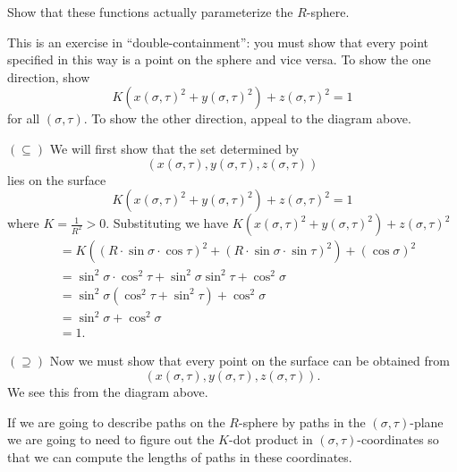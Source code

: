 \documentclass[newpage,hints,handout]{ximera}
\begin{document}
\begin{problem}
  Show that these functions actually parameterize the $R$-sphere.
\begin{hint}
This is an exercise in ``double-containment'': you must show that every point
specified in this way is a point on the sphere and vice versa.  To show the one
direction, show
\[
K\left(x(\sigma,\tau) ^{2}+y(\sigma,\tau) ^{2}\right) +z(\sigma,\tau)^{2} = 1
\]
for all $(\sigma,\tau)$. To show the other direction, appeal to the
diagram above.
\end{hint}
\begin{freeResponse}
  $(\subseteq)$ We will first show that the set determined by
  \[
  \left(x(\sigma,\tau), y(\sigma,\tau), z(\sigma,\tau)\right)
  \]
  lies on the surface
  \[
  K\left(x(\sigma,\tau) ^{2}+y(\sigma,\tau) ^{2}\right) +z(\sigma,\tau)^{2} = 1
  \]
  where $K=\frac{1}{R^2}>0$. Substituting we have
  $K\left(x(\sigma,\tau) ^{2}+y(\sigma,\tau) ^{2}\right)
  +z(\sigma,\tau)^{2}$
  \begin{align*}
    &=K\left((R\cdot\sin\sigma\cdot\cos\tau)^{2}+(R\cdot\sin\sigma\cdot\sin\tau)^{2}\right) +(\cos\sigma)^{2} \\
    &= \sin^2\sigma\cdot\cos^2\tau+\sin^2\sigma\sin^2\tau + \cos^2\sigma \\
    &= \sin^2\sigma(\cos^2\tau+\sin^2\tau) + \cos^2\sigma \\
    &= \sin^2\sigma + \cos^2\sigma \\
    &=1.
  \end{align*}

  $(\supseteq)$ Now we must show that every point on the surface can be obtained from
  \[
  \left(x(\sigma,\tau), y(\sigma,\tau), z(\sigma,\tau)\right).
  \]
  We see this from the diagram above. 
\end{freeResponse}
\end{problem}




If we are going to describe paths on the $R$-sphere by paths in the
$(\sigma,\tau)$-plane we are going to need to figure out the $K$-dot
product in $(\sigma,\tau)$-coordinates so that we can compute the
lengths of paths in these coordinates.
\end{document}

